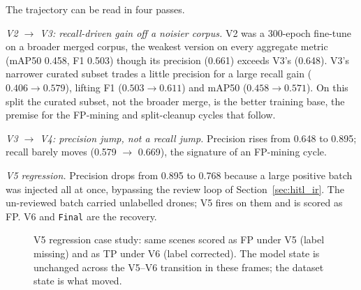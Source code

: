 The trajectory can be read in four passes.

\emph{V2 $\to$ V3: recall-driven gain off a noisier corpus.} V2 was a 300-epoch fine-tune on a broader merged corpus, the weakest version on every aggregate metric (mAP50 0.458, F1 0.503) though its precision (0.661) exceeds V3's (0.648). V3's narrower curated subset trades a little precision for a large recall gain ($0.406 \to 0.579$), lifting F1 ($0.503 \to 0.611$) and mAP50 ($0.458 \to 0.571$). On this split the curated subset, not the broader merge, is the better training base, the premise for the FP-mining and split-cleanup cycles that follow.

\emph{V3 $\to$ V4: precision jump, not a recall jump.} Precision rises from 0.648 to 0.895; recall barely moves (0.579 $\to$ 0.669), the signature of an FP-mining cycle.

\emph{V5 regression.} Precision drops from 0.895 to 0.768 because a large positive batch was injected all at once, bypassing the review loop of Section~\ref{sec:hitl_ir}. The un-reviewed batch carried unlabelled drones; V5 fires on them and is scored as FP. V6 and \texttt{Final} are the recovery.

\begin{figure}[htbp]
    \centering
    \caption{V5 regression case study: same scenes scored as FP under V5 (label missing) and as TP under V6 (label corrected). The model state is unchanged across the V5--V6 transition in these frames; the dataset state is what moved.}
    \label{fig:v5_regression}
\end{figure}

